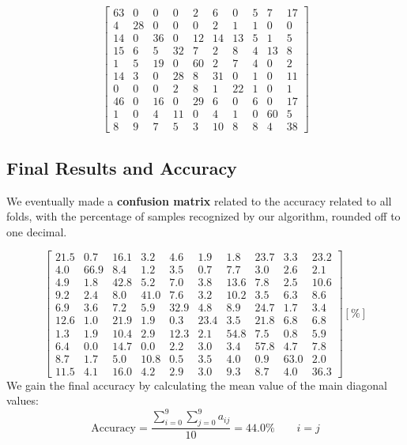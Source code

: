 \documentclass[11pt]{article}
\begin{document}
\begin{equation}
\begin{bmatrix}
63 & 0 & 0 & 0 & 2 & 6 & 0 & 5 & 7 & 17 \\
4 & 28 & 0 & 0 & 0 & 2 & 1 & 1 & 0 & 0 \\
14 & 0 & 36 & 0 & 12 & 14 & 13 & 5 & 1 & 5 \\
15 & 6 & 5 & 32 & 7 & 2 & 8 & 4 & 13 & 8 \\
1 & 5 & 19 & 0 & 60 & 2 & 7 & 4 & 0 & 2 \\
14 & 3 & 0 & 28 & 8 & 31 & 0 & 1 & 0 & 11 \\
0 & 0 & 0 & 2 & 8 & 1 & 22 & 1 & 0 & 1 \\
46 & 0 & 16 & 0 & 29 & 6 & 0 & 6 & 0 & 17 \\
1 & 0 & 4 & 11 & 0 & 4 & 1 & 0 & 60 & 5 \\
8 & 9 & 7 & 5 & 3 & 10 & 8 & 8 & 4 & 38
\end{bmatrix}
\end{equation}

\subsection{Final Results and Accuracy}
We eventually made a \textbf{confusion matrix} related to the accuracy related to all folds, with the percentage of samples recognized by our algorithm, rounded off to one decimal.

\begin{equation}
\begin{bmatrix}
21.5 & 0.7 & 16.1 & 3.2 & 4.6 & 1.9 & 1.8 & 23.7 & 3.3 & 23.2 \\
4.0 & 66.9 & 8.4 & 1.2 & 3.5 & 0.7 & 7.7 & 3.0 & 2.6 & 2.1 \\
4.9 & 1.8 & 42.8 & 5.2 & 7.0 & 3.8 & 13.6 & 7.8 & 2.5 & 10.6 \\
9.2 & 2.4 & 8.0 & 41.0 & 7.6 & 3.2 & 10.2 & 3.5 & 6.3 & 8.6 \\
6.9 & 3.6 & 7.2 & 5.9 & 32.9 & 4.8 & 8.9 & 24.7 & 1.7 & 3.4 \\
12.6 & 1.0 & 21.9 & 1.9 & 0.3 & 23.4 & 3.5 & 21.8 & 6.8 & 6.8 \\
1.3 & 1.9 & 10.4 & 2.9 & 12.3 & 2.1 & 54.8 & 7.5 & 0.8 & 5.9 \\
6.4 & 0.0 & 14.7 & 0.0 & 2.2 & 3.0 & 3.4 & 57.8 & 4.7 & 7.8 \\
8.7 & 1.7 & 5.0 & 10.8 & 0.5 & 3.5 & 4.0 & 0.9 & 63.0 & 2.0 \\
11.5 & 4.1 & 16.0 & 4.2 & 2.9 & 3.0 & 9.3 & 8.7 & 4.0 & 36.3
\end{bmatrix}
[\%]
\end{equation}
We gain the final accuracy by calculating the mean value of the main diagonal values:
\begin{equation}
\mathrm{Accuracy}=\frac{\displaystyle\sum_{i=0}^{9} \sum_{j=0}^{9} a_{ij}}{10}=44.0\% \qquad i=j
\end{equation}
\end{document}
